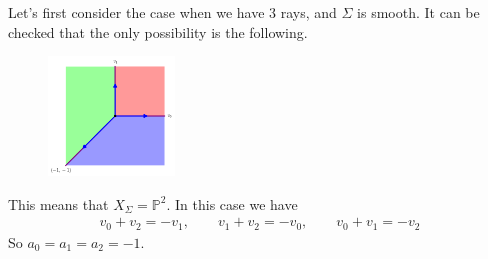 \documentclass[a4paper,12pt]{amsart}
\newcommand{\PP}{\mathbb{P}}
\begin{document}
\begin{example}
	Let's first consider the case when we have 3 rays, and $\Sigma$ is smooth. It can be checked that the only possibility is the following.
	\vspace{5cm}
	\begin{figure}[h]
		\centering
		\includegraphics[width=0.3\textwidth]{pic/Mar21_fan4}
	\end{figure}

This means that $X_\Sigma=\PP^2$. In this case we have
\begin{align*}
	v_0+v_2=-v_1,\qquad v_1+v_2=-v_0,\qquad v_0+v_1=-v_2
\end{align*}
So $a_0=a_1=a_2=-1$.
\end{example}
\end{document}
